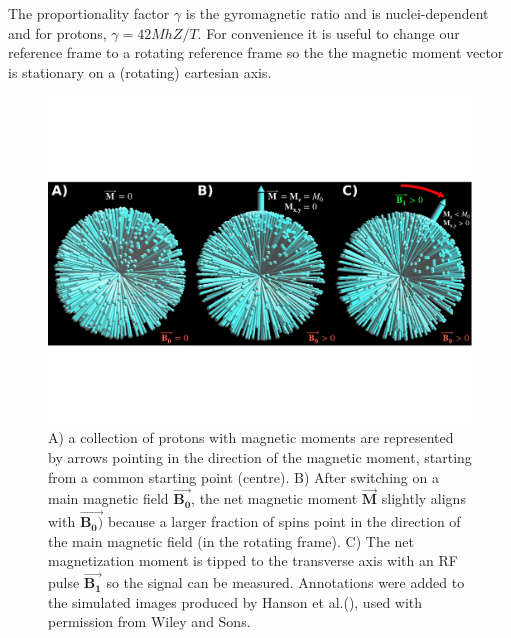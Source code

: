 The proportionality factor $\gamma$ is the gyromagnetic ratio and is nuclei-dependent and for protons, $\gamma = 42 MhZ /T$.
For convenience it is useful to change our reference frame to a rotating reference frame so the the magnetic moment vector is stationary on a (rotating) cartesian axis.

\begin{figure}
	\centering
	\includegraphics[width=\textwidth]{./intro/intro-images/HansonMRI.pdf}
	\caption{A) a collection of protons with magnetic moments are represented by arrows pointing in the direction of the magnetic moment, starting from a common starting point (centre). B) After switching on a main magnetic field $\vec{\mathbf{B_0}}$, the net magnetic moment $\vec{\mathbf{M}}$ slightly aligns with $\vec{\mathbf{B_0)}}$ because a larger fraction of spins point in the direction of the main magnetic field (in the rotating frame). C) The net magnetization moment is tipped to the transverse axis with an RF pulse $\vec{\mathbf{B_1}}$ so the signal can be measured. 
Annotations were added to the simulated images produced by Hanson et al.(\cite{Hanson:2008tp}), used with permission from Wiley and Sons.}
	\label{spinsB0B1}
\end{figure}

